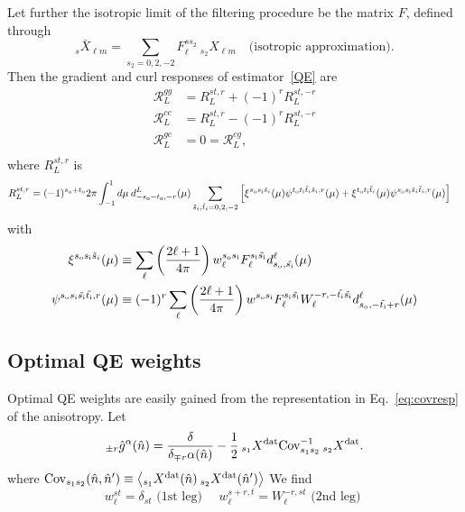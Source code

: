 \documentclass{article}
\newcommand{\Cov}[0]{{\textrm{Cov}}}
\newcommand{\si}[0]{{s_{\rm i}}}
\newcommand{\ti}[0]{{t_{\rm i}}}
\newcommand{\so}[0]{{s_{\rm o}}}
\renewcommand{\to}[0]{{t_{\rm o}}}
\newcommand{\av}[1]{\left\langle #1 \right\rangle}
\newcommand{\resp}{ {\mathcal R} }
\newcommand{\hn}[0]{\hat n}
\begin{document}
Let further the isotropic limit of the filtering procedure be the matrix $F$, defined through
\begin{equation}
	_{s}\bar X_{\ell m} = \sum_{s_2 = 0,2,-2}F_\ell^{s s_2} \:_{s_2}X_{\ell m} \quad \textrm{(isotropic approximation)}.
\end{equation} 
Then the gradient and curl responses of estimator~\eqref{QE} are
\begin{equation}\boxed{
	\begin{split}
		\resp^{gg}_L &= R_L^{st, r} + (-1)^r R_L^{st, -r}\\
		\resp^{cc}_L &= R_L^{st, r} - (-1)^r R_L^{st, -r} \\
		\resp^{gc}_L &= 0 = \resp^{cg}_L, \\
	\end{split}}
\end{equation}
where $R_L^{st, r}$ is
\begin{equation}
\begin{split}
R_L^{st, r} &= (-1)^{\so + \to }2\pi  \int_{-1}^1 d \mu\: d^L_{-\so - \to, -r}(\mu)\sum_{\tilde s_i,\tilde t_i = 0,2,-2}  \left[\xi^{\so \si \tilde s_i} (\mu)\psi^{\to \ti \tilde t_i \tilde s_i, r }(\mu) +  \xi^{\to \ti \tilde t_i}(\mu) \psi^{\so \si \tilde s_i \tilde t_i, r }(\mu) \right]
\end{split}
\end{equation}
with
\begin{equation}
\begin{split}
\xi^{\so\si \tilde s_i}(\mu) &\equiv  \sum_\ell \left(\frac{2\ell + 1}{4\pi}\right)w^{\so\si}_\ell F_\ell^{\si \tilde \si} d^\ell_{\so,\tilde \si}(\mu) \\
\psi^{\so\si \tilde \si \tilde \ti, r}(\mu) &\equiv  (-1)^r \sum_\ell \left(\frac{2\ell + 1}{4\pi}\right)w^{\so \si}F^{\si \tilde \si}_\ell W_\ell^{-r, -\tilde \ti \tilde \si} d^\ell_{\so,-\tilde \ti + r}(\mu) 
\end{split}
\end{equation}

\subsection{Optimal QE weights}Optimal QE weights are easily gained from the representation in Eq.~\ref{eq:covresp} of the anisotropy. Let
\begin{equation}
	_{\pm r}\hat g^\alpha(\hn) = \frac{\delta }{\delta _{\mp r}\alpha (\hn)} -\frac 12\: _{s_1}X^{\rm dat} \Cov^{-1}_{s_1s_2} \:_{s_2}X^{\rm dat}.
\end{equation}
where $\Cov_{s_1 s_2}(\hn, \hn') \equiv \av{_{s_1}X^{\rm dat}(\hn) \:_{s_2}X^{\rm dat}(\hn') }$
We find
\begin{equation}\boxed{
	w_\ell^{st} = \delta_{st} \textrm{   (1st leg)  } \quad 	w_\ell^{s + r, t} = W^{-r, st}_\ell \textrm{   (2nd leg)  }}
\end{equation}
\end{document}
